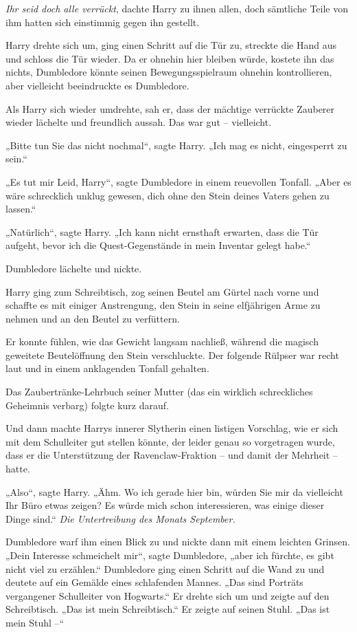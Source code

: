 {\emph{Ihr seid doch alle verrückt}, dachte Harry zu ihnen allen, doch sämtliche Teile von ihm hatten sich einstimmig gegen ihn gestellt.

Harry drehte sich um, ging einen Schritt auf die Tür zu, streckte die Hand aus und schloss die Tür wieder. Da er ohnehin hier bleiben würde, kostete ihn das nichts, Dumbledore könnte seinen Bewegungsspielraum ohnehin kontrollieren, aber vielleicht beeindruckte es Dumbledore.

Als Harry sich wieder umdrehte, sah er, dass der mächtige verrückte Zauberer wieder lächelte und freundlich aussah. Das war gut -- vielleicht.

„Bitte tun Sie das nicht nochmal“, sagte Harry. „Ich mag es nicht, eingesperrt zu sein.“

„Es tut mir Leid, Harry“, sagte Dumbledore in einem reuevollen Tonfall. „Aber es wäre schrecklich unklug gewesen, dich ohne den Stein deines Vaters gehen zu lassen.“

„Natürlich“, sagte Harry. „Ich kann nicht ernsthaft erwarten, dass die Tür aufgeht, bevor ich die Quest-Gegenstände in mein Inventar gelegt habe.“

Dumbledore lächelte und nickte.

Harry ging zum Schreibtisch, zog seinen Beutel am Gürtel nach vorne und schaffte es mit einiger Anstrengung, den Stein in seine elfjährigen Arme zu nehmen und an den Beutel zu verfüttern.

Er konnte fühlen, wie das Gewicht langsam nachließ, während die magisch geweitete Beutelöffnung den Stein verschluckte. Der folgende Rülpser war recht laut und in einem anklagenden Tonfall gehalten.

Das Zaubertränke-Lehrbuch seiner Mutter (das ein wirklich schreckliches Geheimnis verbarg) folgte kurz darauf.

Und dann machte Harrys innerer Slytherin einen listigen Vorschlag, wie er sich mit dem Schulleiter gut stellen könnte, der leider genau so vorgetragen wurde, dass er die Unterstützung der Ravenclaw-Fraktion -- und damit der Mehrheit -- hatte.

„Also“, sagte Harry. „Ähm. Wo ich gerade hier bin, würden Sie mir da vielleicht Ihr Büro etwas zeigen? Es würde mich schon interessieren, was einige dieser Dinge sind.“ \emph{Die Untertreibung des Monats September.}

Dumbledore warf ihm einen Blick zu und nickte dann mit einem leichten Grinsen. „Dein Interesse schmeichelt mir“, sagte Dumbledore, „aber ich fürchte, es gibt nicht viel zu erzählen.“ Dumbledore ging einen Schritt auf die Wand zu und deutete auf ein Gemälde eines schlafenden Mannes. „Das sind Porträts vergangener Schulleiter von Hogwarts.“ Er drehte sich um und zeigte auf den Schreibtisch. „Das ist mein Schreibtisch.“ Er zeigte auf seinen Stuhl. „Das ist mein Stuhl --“

}
